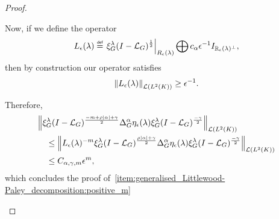 \begin{proof}
\begin{description}
            Now, if we define the operator
            \begin{align*}
                L_\epsilon(\lambda) \defeq \eval {\Rep \lambda \BesselPotential 1} {R_\epsilon(\lambda)} \bigoplus c_\alpha \epsilon^{-1} \Id {\R_\epsilon(\lambda)^\perp},
            \end{align*}
            then by construction our operator satisfies
            \begin{align*}
                \norm [\Lin {\Lebesgue 2 \CompactGroup}] {L_\epsilon(\lambda)} \geq \epsilon^{-1}.
            \end{align*}

            Therefore,
            \begin{align*}
                &\norm [\Lin {\Lebesgue 2 \CompactGroup}] {%
                    \Rep \lambda \BesselPotential {-m + \rho \abs\alpha + \gamma}
                    \DifferenceOperatorOrder \alpha \eta_\epsilon(\lambda)
                    \Rep \lambda \BesselPotential {-\gamma}
                }\\
                &\quad \leq \norm [\Lin {\Lebesgue 2 \CompactGroup}] {%
                    L_\epsilon(\lambda)^{-m}
                    \Rep \lambda \BesselPotential {\rho \abs \alpha + \gamma}
                    \DifferenceOperatorOrder \alpha \eta_\epsilon(\lambda)
                    \Rep \lambda \BesselPotential {-\gamma}
                }\\
                &\quad \leq C_{\alpha, \gamma, m} \epsilon^{m},
            \end{align*}
            which concludes the proof of~\ref{item:generalised_Littlewood-Paley_decomposition:positive_m}
    \end{description}
\end{proof}

